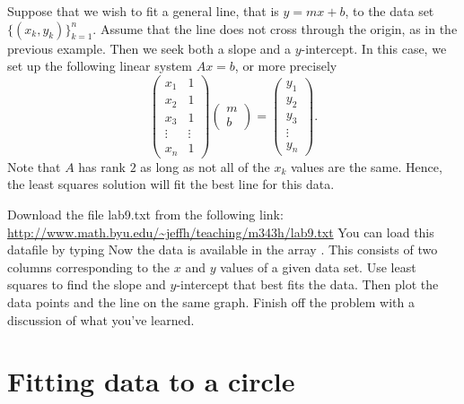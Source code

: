 Suppose that we wish to fit a general line, that is $y=m x+b$, to the data set $\{(x_k,y_k)\}^n_{k=1}$.  Assume that the line does not cross through the origin, as in the previous example.  Then we seek both a slope and a $y$-intercept.  In this case, we set up the following linear system $A x = b$, or more precisely
\[
\begin{pmatrix}
x_1 & 1\\
x_2 & 1\\
x_3 & 1\\
\vdots & \vdots\\
x_n & 1
\end{pmatrix}
\begin{pmatrix}
m\\
b
\end{pmatrix}=
\begin{pmatrix}
y_1\\
y_2\\
y_3\\
\vdots\\
y_n
\end{pmatrix}.
\]
Note that $A$ has rank $2$ as long as not all of the $x_k$ values are the same.  Hence, the least squares solution will fit the best line for this data.


\begin{problem}
Download the file lab9.txt from the following link:
\url{http://www.math.byu.edu/~jeffh/teaching/m343h/lab9.txt}
You can load this datafile by typing
Now the data is available in the array .
This consists of two columns corresponding to the $x$ and $y$ values of a given data set.  Use least squares to find the slope and $y$-intercept that best fits the data.  Then plot the data points and the line on the same graph.  Finish off the problem with a discussion of what you've learned.
\end{problem}

\section*{Fitting data to a circle}

